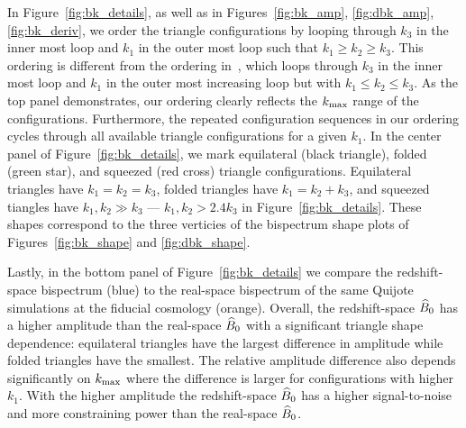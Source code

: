 In Figure~\ref{fig:bk_details}, as well as in Figures~\ref{fig:bk_amp}, \ref{fig:dbk_amp}, 
\ref{fig:bk_deriv}, we order the triangle configurations by looping through 
$k_3$ in the inner most loop and $k_1$ in the outer most loop such that 
$k_1 \geq k_2 \geq k_3$. This ordering is different from the ordering in~\cite{gil-marin2017}, 
which loops through $k_3$ in the inner most loop and $k_1$ in the outer most 
increasing loop but with $k_1 \leq k_2 \leq k_3$. As the top panel demonstrates, 
our ordering clearly reflects the $k_{\rm max}$ range of the configurations. 
Furthermore, the repeated configuration sequences in our ordering cycles through
all available triangle configurations for a given $k_1$. In the center panel 
of Figure~\ref{fig:bk_details}, we mark equilateral (black triangle), folded 
(green star), and squeezed (red cross) triangle configurations. Equilateral 
triangles have $k_1 = k_2 = k_3$, folded triangles have $k_1 = k_2 + k_3$, and 
squeezed tiangles have $k_1, k_2 \gg k_3$ --- $k_1, k_2 > 2.4k_3$ in Figure~\ref{fig:bk_details}. 
These shapes correspond to the three verticies of the bispectrum shape plots of 
Figures~\ref{fig:bk_shape} and \ref{fig:dbk_shape}. 

Lastly, in the bottom panel of Figure~\ref{fig:bk_details} we compare the 
redshift-space bispectrum (blue) to the real-space bispectrum of the same 
Quijote simulations at the fiducial cosmology (orange). Overall, the 
redshift-space $\widehat{B}_0$ has a higher amplitude than the real-space $\widehat{B}_0$ with 
a significant triangle shape dependence: equilateral triangles have the 
largest difference in amplitude while folded triangles have the smallest. 
The relative amplitude difference also depends significantly on $k_{\rm max}$ 
where the difference is larger for configurations with higher $k_1$. With 
the higher amplitude the redshift-space $\widehat{B}_0$ has a higher signal-to-noise 
and more constraining power than the real-space $\widehat{B}_0$.  

